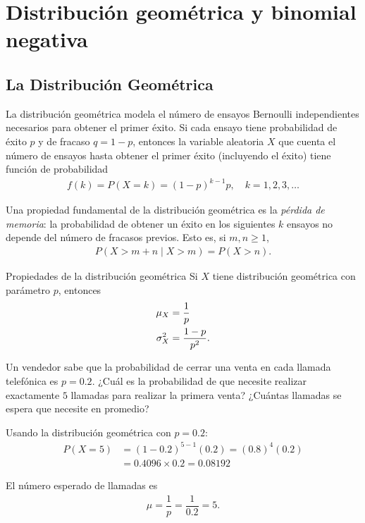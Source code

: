 \section{Distribución geométrica y binomial negativa}
\subsection{La Distribución Geométrica}

La distribución geométrica modela el número de ensayos Bernoulli independientes necesarios para obtener el primer éxito. Si cada ensayo tiene probabilidad de éxito $p$ y de fracaso $q=1-p$, entonces la variable aleatoria $X$ que cuenta el número de ensayos hasta obtener el primer éxito (incluyendo el éxito) tiene función de probabilidad
\begin{align}
 \label{eq:2.10.9}
 f(k) = P(X=k) = (1-p)^{k-1}p, \quad k=1,2,3,\dots
\end{align}

Una propiedad fundamental de la distribución geométrica es la \emph{pérdida de memoria}: la probabilidad de obtener un éxito en los siguientes $k$ ensayos no depende del número de fracasos previos. Esto es, si $m,n\geq 1$,
\begin{align}
 P(X > m+n \mid X > m) = P(X > n).
\end{align}

{Propiedades de la distribución geométrica} Si $X$ tiene distribución geométrica con parámetro $p$, entonces
\begin{align}
 \mu_{X} &= \dfrac{1}{p} \\
 \sigma_{X}^{2} &= \dfrac{1-p}{p^{2}}.
\end{align}

\begin{ejemplo}
 \label{exmp:2.10.13}
 Un vendedor sabe que la probabilidad de cerrar una venta en cada llamada telefónica es $p=0.2$. ¿Cuál es la probabilidad de que necesite realizar exactamente $5$ llamadas para realizar la primera venta? ¿Cuántas llamadas se espera que necesite en promedio?
\end{ejemplo}

\begin{solucion}
	Usando la distribución geométrica con $p=0.2$:
	\begin{align}
		P(X=5) &= (1-0.2)^{5-1}(0.2) = (0.8)^{4}(0.2) \\
		&= 0.4096 \times 0.2 = 0.08192
	\end{align}

	El número esperado de llamadas es
	\begin{align}
		\mu = \dfrac{1}{p} = \dfrac{1}{0.2} = 5.
	\end{align}
\end{solucion}

